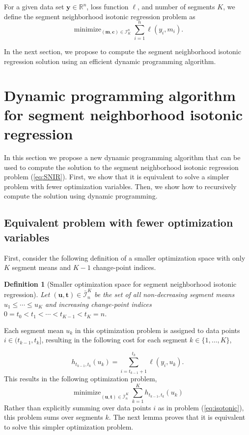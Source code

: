 \documentclass{article}
\newtheorem{definition}{Definition}
\DeclareMathOperator*{\minimize}{minimize}
\newcommand{\RR}{\mathbb R}
\begin{document}
For a given data set $\mathbf y\in\RR^n$, loss function $\ell$, and
number of segments $K$, we define the segment neighborhood isotonic regression
problem as
\begin{equation}
  \label{eq:SNIR}
  \minimize_{(\mathbf m, \mathbf c)\in\mathcal I_K^n} \sum_{i=1}^n \ell(y_i, m_i).
\end{equation}

In the next section, we propose to compute the segment neighborhood isotonic regression solution
using an efficient dynamic programming algorithm.

\newcommand{\FCC}{C}
\newcommand{\M}{\mathcal{M}}
\section{Dynamic programming algorithm for segment neighborhood isotonic regression}

In this section we propose a new dynamic programming algorithm that
can be used to compute the solution to the segment neighborhood isotonic
regression problem (\ref{eq:SNIR}). First, we show
that it is equivalent to solve a simpler problem with fewer
optimization variables. Then, we show how to recursively compute the
solution using dynamic programming.

\subsection{Equivalent problem with fewer optimization 
variables}

First, consider the following definition of a smaller optimization
space with only $K$ segment means and $K-1$ change-point indices.

\begin{definition}[Smaller optimization space for segment neighborhood isotonic regression]
\label{def:Ibar}
  Let $(\mathbf u, \mathbf t)\in\bar{\mathcal I}_n^K$ be the set of
  all non-decreasing segment means $u_1\leq\cdots\leq u_K$ and
  increasing change-point indices $0=t_0<t_1<\cdots<t_{K-1}<t_K=n$.
\end{definition}

Each segment mean $u_k$ in this optimization problem is assigned to
data points $i\in(t_{k-1},t_k]$, resulting in the following cost
for each segment $k\in\{1, \dots, K\}$,

\begin{equation}
  \label{eq:h}
  h_{t_{k-1}, t_k}(u_k) = \sum_{i=t_{k-1}+1}^{t_k} \ell(y_i, u_k).
\end{equation}
This results in the following optimization problem,
\begin{equation}
  \label{eq:isotonic_ut}
  \minimize_{(\mathbf u, \mathbf t)\in\bar{\mathcal I}_n^K}
  \sum_{k=1}^K
  h_{t_{k-1}, t_k}(u_k)
\end{equation}
Rather than explicitly summing over data points $i$ as in problem
(\ref{eq:isotonic}), this problem sums over segments $k$. The next lemma
proves that it is equivalent to solve this simpler optimization problem.
\end{document}

